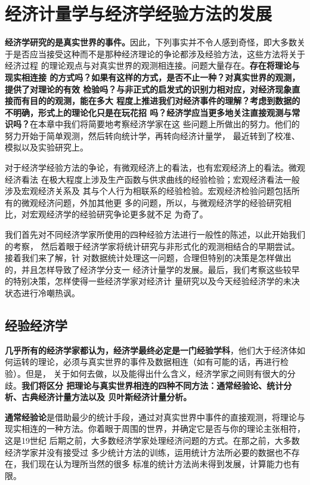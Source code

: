 \chapter{经济计量学与经济学经验方法的发展}

\textbf{经济学研究的是真实世界的事件。}因此，下列事实并不令人感到奇怪，即大多数关
于是否应当接受这种而不是那种经济理论的争论都涉及经验方法，这些方法将关于经济过程
的理论观点与对真实世界的观测相连接。问题大量存在。\textbf{存在将理论与现实相连接
  的方式吗？如果有这样的方式，是否不止一种？对真实世界的观测，提供了对理论的有效
  检验吗？与非正式的启发式的识别力相对应，对经济现象直接而有目的的观测，能在多大
  程度上推进我们对经济事件的理解？考虑到数据的不明确，形式上的理论化只是在玩花招
  吗？经济学应当更多地关注直接观测与常识吗？}在本章中我们将简要地考察经济学家在这
些问题上所做出的努力。他们的努力开始于简单观测，然后转向统计学，再转向经济计量学，
最近转到了校准、模拟以及实验研究上。

对于经济学经验方法的争论，有微观经济上的看法，也有宏观经济上的看法。微观经济看法
在极大程度上涉及生产函数与供求曲线的经验检验；宏观经济看法一般涉及宏观经济关系及
其与个人行为相联系的经验检验。宏观经济检验问题包括所有的微观经济问题，外加其他更
多的问题，所以，与微观经济学的经验研究相比，对宏观经济学的经验研究争论更多就不足
为奇了。

我们首先对不同经济学家所使用的四种经验方法进行一般性的陈述，以此开始我们的考察，
然后着眼于经济学家将统计研究与非形式化的观测相结合的早期尝试。接着我们来了解，针
对数据统计处理这一问题，合理但特别的决策是怎样做出的，并且怎样导致了经济学分支一
经济计量学的发展。最后，我们考察这些较早的特别决策，怎样使得一些经济学家对经济计
量研究以及今天经验经济学的未决状态进行冷嘲热讽。

\section{经验经济学}

\textbf{几乎所有的经济学家都认为，经济学最终必定是一门经验学科}，他们大于经济体如
何运转的理论，必须与真实世界的事件及数据相连（如有可能的话，再进行检验）。但是，
关于如何去做，以及能得出什么含义，经济学家之间则有很大的分歧。\textbf{我们将区分
  把理论与真实世界相连的四种不同方法：通常经验论、统计分析、古典经济计量方法以及
  贝叶斯经济计量分析。}

\textbf{通常经验论}是借助最少的统计手段，通过对真实世界中事件的直接观测，将理论与
现实相连的一种方法。你着眼于周围的世界，并确定它是否与你的理论主张相符，这是19世纪
后期之前，大多数经济学家处理经济问题的方式。在那之前，大多数经济学家并没有接受过
多少统计方法的训练，运用统计方法所必要的数据也不存在，我们现在认为理所当然的很多
标准的统计方法尚未得到发展，计算能力也有限。

